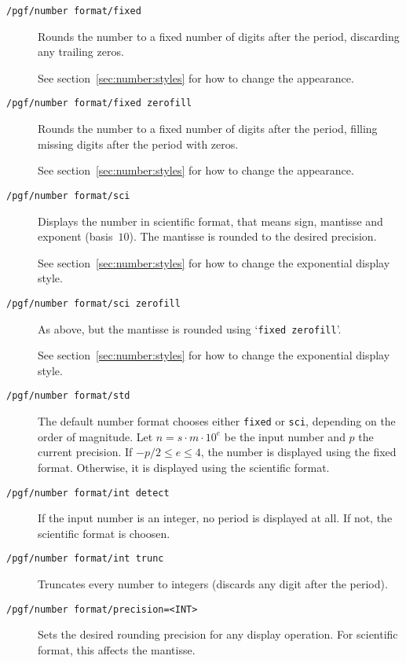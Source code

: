 \begin{description}
\item[\texttt{/pgf/number format/fixed}]
Rounds the number to a fixed number of digits after the period, discarding any trailing zeros.


See section~\ref{sec:number:styles} for how to change the appearance.

\item[\texttt{/pgf/number format/fixed zerofill}]
Rounds the number to a fixed number of digits after the period, filling missing digits after the period with zeros.


See section~\ref{sec:number:styles} for how to change the appearance.

\item[\texttt{/pgf/number format/sci}]
Displays the number in scientific format, that means sign, mantisse and exponent (basis~$10$). The mantisse is rounded to the desired precision.


See section~\ref{sec:number:styles} for how to change the exponential display style.

\item[\texttt{/pgf/number format/sci zerofill}]
As above, but the mantisse is rounded using `\texttt{fixed zerofill}'.


See section~\ref{sec:number:styles} for how to change the exponential display style.


\item[\texttt{/pgf/number format/std}]
The default number format chooses either \texttt{fixed} or \texttt{sci}, depending on the order of magnitude. Let $n=s \cdot m \cdot 10^e$ be the input number and $p$ the current precision. If $-p/2 \le e \le 4$, the number is displayed using the fixed format. Otherwise, it is displayed using the scientific format. 


\item[\texttt{/pgf/number format/int detect}]
If the input number is an integer, no period is displayed at all. If not, the scientific format is choosen.

\begingroup
\def\examplenumbers{15,20,20.4,0.01,0}%
%
\endgroup

\item[\texttt{/pgf/number format/int trunc}]
Truncates every number to integers (discards any digit after the period).

%

\item[\texttt{/pgf/number format/precision=<INT>}]
Sets the desired rounding precision for any display operation. For scientific format, this affects the mantisse.
\end{description}

